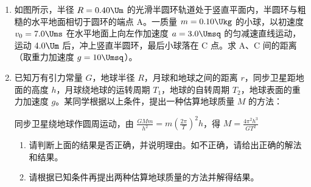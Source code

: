\documentclass[\gkver]{gaokaozhenti}
\begin{document}
\begin{enumerate}
\begin{enumerate}

\end{enumerate}



\item
如图所示，半径 $R=0.40\Um$ 的光滑半圆环轨道处于竖直平面内，半圆环与粗糙的水平地面相切于圆环的端点 A。一质量 $m=0.10\Ukg$ 的小球，以初速度 $v_{0}=7.0\Ums$ 在水平地面上向左作加速度 $a=3.0\Umsq$ 的匀减速直线运动，运动 $4.0\Um$ 后，冲上竖直半圆环，最后小球落在 C 点。求 A、C 间的距离（取重力加速度 $g=10\Umsq$）。


\jdanswer{$1.2\Um$}


\item
已知万有引力常量 $G$，地球半径 $R$，月球和地球之间的距离 $r$，同步卫星距地面的高度 $h$，月球绕地球的运转周期 $T_{1}$，地球的自转周期 $T_{2}$，地球表面的重力加速度 $g$。某同学根据以上条件，提出一种估算地球质量 $M$ 的方法：

同步卫星绕地球作圆周运动，由 $\frac{GMm}{h^{2}}=m\left(\frac{2\pi}{T}\right)^{2}h$，得 $M=\frac{4\pi^{2}h^{3}}{GT^{2}}$

\begin{enumerate}
	\item
	请判断上面的结果是否正确，并说明理由。如不正确，请给出正确的解法和结果。
	\item
	请根据已知条件再提出两种估算地球质量的方法并解得结果。
\end{enumerate}


\end{enumerate}
\end{document}
